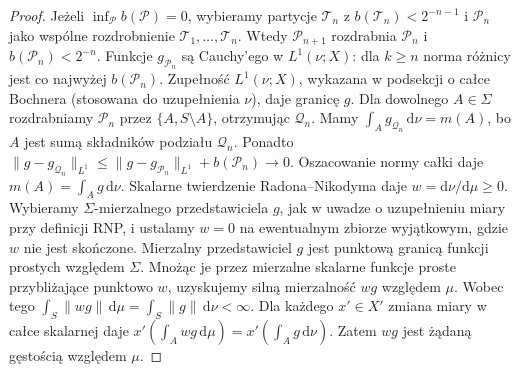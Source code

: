 \begin{proof}
Jeżeli $\inf_{\mathcal P}b(\mathcal P)=0$, wybieramy
partycje $\mathcal T_n$ z $b(\mathcal T_n)<2^{-n-1}$
i $\mathcal P_n$ jako wspólne rozdrobnienie
$\mathcal T_1,\ldots,\mathcal T_n$. Wtedy $\mathcal P_{n+1}$
rozdrabnia $\mathcal P_n$ i $b(\mathcal P_n)<2^{-n}$.
Funkcje $g_{\mathcal P_n}$ są Cauchy'ego w $L^1(\nu;X)$:
dla $k\ge n$ norma różnicy jest co najwyżej $b(\mathcal P_n)$.
Zupełność $L^1(\nu;X)$, wykazana w podsekcji
o całce Bochnera (stosowana do uzupełnienia $\nu$),
daje granicę $g$. Dla dowolnego $A\in\Sigma$ rozdrabniamy
$\mathcal P_n$ przez $\{A,S\setminus A\}$, otrzymując
$\mathcal Q_n$. Mamy $\int_Ag_{\mathcal Q_n}\,\mathrm d\nu=m(A)$,
bo $A$ jest sumą składników podziału $\mathcal Q_n$.
Ponadto
$\|g-g_{\mathcal Q_n}\|_{L^1}\le
\|g-g_{\mathcal P_n}\|_{L^1}+b(\mathcal P_n)\to0$.
Oszacowanie normy całki daje $m(A)=\int_Ag\,\mathrm d\nu$.
Skalarne twierdzenie Radona--Nikodyma daje
$w=\mathrm d\nu/\mathrm d\mu\ge0$. Wybieramy
$\Sigma$-mierzalnego przedstawiciela $g$, jak w uwadze
o uzupełnieniu miary przy definicji RNP, i ustalamy
$w=0$ na ewentualnym zbiorze wyjątkowym, gdzie
$w$ nie jest skończone. Mierzalny przedstawiciel
$g$ jest punktową granicą funkcji prostych względem
$\Sigma$. Mnożąc je przez mierzalne skalarne funkcje
proste przybliżające punktowo $w$, uzyskujemy
silną mierzalność $wg$ względem $\mu$. Wobec tego
$\int_S\|wg\|\,\mathrm d\mu=\int_S\|g\|\,\mathrm d\nu<\infty$.
Dla każdego $x'\in X'$ zmiana miary w całce skalarnej
daje $x'(\int_Awg\,\mathrm d\mu)=x'(\int_Ag\,\mathrm d\nu)$.
Zatem $wg$ jest żądaną gęstością względem $\mu$.


\end{proof}
